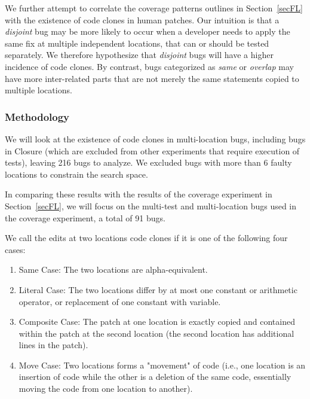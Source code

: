 \documentclass[10pt, conference]{IEEEtran}
\begin{document}
We further attempt to correlate the coverage patterns outlines in
Section~\ref{secFL} with the existence of code clones in human patches.  Our 
intuition is that a \emph{disjoint} bug may be more likely to occur when a
developer needs to apply the same fix at multiple independent locations, that
can or should be tested separately.  We therefore 
 hypothesize that \emph{disjoint} bugs will have a higher incidence of code
clones. By contrast, bugs categorized as \emph{same} or \emph{overlap} may have
more inter-related parts that are not merely the same statements copied to
multiple locations.


\subsubsection{Methodology}
\label{sec52}
We will look at the existence of code clones in multi-location bugs, including bugs in Closure (which are 
excluded from other experiments that require execution of tests), leaving 216 bugs to analyze. We 
excluded bugs with more than 6 faulty locations to constrain the search space.

In comparing these results with the results of the coverage experiment in
Section~\ref{secFL}, we will focus on the multi-test and multi-location bugs used in the coverage 
experiment, a total of 91 bugs.

We call the edits at two locations code clones if it is one of the following four cases:
\begin{enumerate}
	\item Same Case: The two locations are alpha-equivalent. 
	\item Literal Case: The two locations differ by at most one constant or arithmetic operator,
	or replacement of one constant with variable.
	\item Composite Case: The patch at one location is exactly copied and contained within the patch at 
	the 
	second location (the second location  has additional lines in the patch).
	\item Move Case: Two locations forms a "movement" of code (i.e., one location is an insertion of 
	code 
	while the other is a deletion of the same code, essentially moving the code from one location to 
	another).
\end{enumerate}
\end{document}
